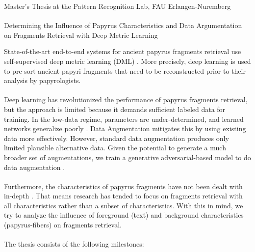 \documentclass[12pt,a4paper]{article}
\begin{document}
\begin{center}
	Master's Thesis at the Pattern Recognition Lab, FAU Erlangen-Nuremberg \hfill \\[5mm]
																				
	\mbox{}\\
	{\Large Determining the Influence of Papyrus Characteristics and Data Argumentation on Fragments Retrieval with Deep Metric Learning}
			
\end{center}


State-of-the-art end-to-end systems for ancient papyrus fragments retrieval use self-supervised deep metric learning (DML) \cite{Pirrone21}. More precisely, deep learning is used to pre-sort ancient papyri fragments that need to be reconstructed prior to their analysis by papyrologists. 
\\
\\
Deep learning has revolutionized the performance of papyrus fragments retrieval, but the approach is limited because it demands sufficient labeled data for training. In the low-data regime, parameters are under-determined, and learned networks generalize poorly \cite{Antoniou18}. Data Augmentation mitigates this by using existing data more effectively. However, standard data augmentation produces only limited plausible alternative data. Given the potential to generate a much broader set of augmentations, we train a generative adversarial-based model to do data augmentation \cite{Tensmeyer20, Antoniou18}. 
\\
\\
Furthermore, the characteristics of papyrus fragments have not been dealt with in-depth \cite{Tensmeyer20}. That means research has tended to focus on fragments retrieval with all characteristics rather than a subset of characteristics. With this in mind, we try to analyze the influence of foreground (text) and background characteristics (papyrus-fibers) on fragments retrieval.
\\
\\
The thesis consists of the following milestones: 
\end{document}
